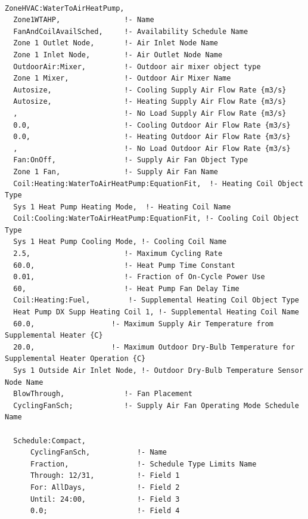 \begin{lstlisting}

ZoneHVAC:WaterToAirHeatPump,
  Zone1WTAHP,               !- Name
  FanAndCoilAvailSched,     !- Availability Schedule Name
  Zone 1 Outlet Node,       !- Air Inlet Node Name
  Zone 1 Inlet Node,        !- Air Outlet Node Name
  OutdoorAir:Mixer,         !- Outdoor air mixer object type
  Zone 1 Mixer,             !- Outdoor Air Mixer Name
  Autosize,                 !- Cooling Supply Air Flow Rate {m3/s}
  Autosize,                 !- Heating Supply Air Flow Rate {m3/s}
  ,                         !- No Load Supply Air Flow Rate {m3/s}
  0.0,                      !- Cooling Outdoor Air Flow Rate {m3/s}
  0.0,                      !- Heating Outdoor Air Flow Rate {m3/s}
  ,                         !- No Load Outdoor Air Flow Rate {m3/s}
  Fan:OnOff,                !- Supply Air Fan Object Type
  Zone 1 Fan,               !- Supply Air Fan Name
  Coil:Heating:WaterToAirHeatPump:EquationFit,  !- Heating Coil Object Type
  Sys 1 Heat Pump Heating Mode,  !- Heating Coil Name
  Coil:Cooling:WaterToAirHeatPump:EquationFit, !- Cooling Coil Object Type
  Sys 1 Heat Pump Cooling Mode, !- Cooling Coil Name
  2.5,                      !- Maximum Cycling Rate
  60.0,                     !- Heat Pump Time Constant
  0.01,                     !- Fraction of On-Cycle Power Use
  60,                       !- Heat Pump Fan Delay Time
  Coil:Heating:Fuel,         !- Supplemental Heating Coil Object Type
  Heat Pump DX Supp Heating Coil 1, !- Supplemental Heating Coil Name
  60.0,                  !- Maximum Supply Air Temperature from Supplemental Heater {C}
  20.0,                  !- Maximum Outdoor Dry-Bulb Temperature for Supplemental Heater Operation {C}
  Sys 1 Outside Air Inlet Node, !- Outdoor Dry-Bulb Temperature Sensor Node Name
  BlowThrough,              !- Fan Placement
  CyclingFanSch;            !- Supply Air Fan Operating Mode Schedule Name

  Schedule:Compact,
      CyclingFanSch,           !- Name
      Fraction,                !- Schedule Type Limits Name
      Through: 12/31,          !- Field 1
      For: AllDays,            !- Field 2
      Until: 24:00,            !- Field 3
      0.0;                     !- Field 4


\end{lstlisting}
